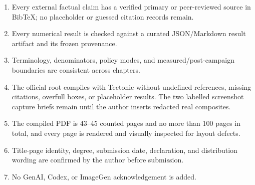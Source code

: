 \documentclass[10pt,a4paper]{article}
\begin{document}
\begin{enumerate}
  \item Every external factual claim has a verified primary or peer-reviewed
  source in BibTeX; no placeholder or guessed citation records remain.
  \item Every numerical result is checked against a curated JSON/Markdown
  result artifact and its frozen provenance.
  \item Terminology, denominators, policy modes, and measured/post-campaign
  boundaries are consistent across chapters.
  \item The official root compiles with Tectonic without undefined
  references, missing citations, overfull boxes, or placeholder results. The
  two labelled screenshot capture briefs remain until the author inserts
  redacted real composites.
  \item The compiled PDF is 43--45 counted pages and no more than 100 pages in
  total, and every page is rendered and visually inspected for layout defects.
  \item Title-page identity, degree, submission date, declaration, and
  distribution wording are confirmed by the author before submission.
  \item No GenAI, Codex, or ImageGen acknowledgement is added.
\end{enumerate}
\end{document}
